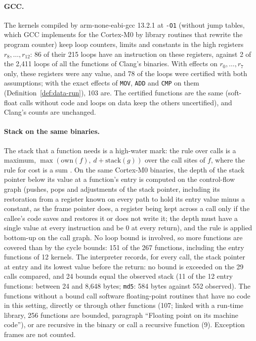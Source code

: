 \documentclass[oneside,english]{amsart}
\numberwithin{equation}{section}
\theoremstyle{plain}
\theoremstyle{definition}
\theoremstyle{plain}
\theoremstyle{plain}
\theoremstyle{remark}
\begin{document}
\paragraph{GCC.} The kernels compiled by arm-none-eabi-gcc 13.2.1 at \texttt{-O1} (without jump tables, which GCC implements for the Cortex-M0 by library routines that rewrite the program counter) keep loop counters, limits and constants in the high registers $r_8, \dots, r_{12}$: 86 of their 215 loops have an instruction on these registers, against 2 of the 2{,}411 loops of all the functions of Clang's binaries. With effects on $r_0, \dots, r_7$ only, these registers were any value, and 78 of the loops were certified with both assumptions; with the exact effects of \texttt{MOV}, \texttt{ADD} and \texttt{CMP} on them (Definition~\ref{def:data-run}), 103 are. The certified functions are the same (soft-float calls without code and loops on data keep the others uncertified), and Clang's counts are unchanged.

\paragraph{Stack on the same binaries.}
The stack that a function needs is a high-water mark: the rule over calls is a maximum, $\max(\mathrm{own}(f),\ d + \mathrm{stack}(g))$ over the call sites of $f$, where the rule for cost is a sum \cite[Proposition~\ref{I-prop:stack}]{crosscheckTheory}. On the same Cortex-M0 binaries, the depth of the stack pointer below its value at a function's entry is computed on the control-flow graph (pushes, pops and adjustments of the stack pointer, including its restoration from a register known on every path to hold its entry value minus a constant, as the frame pointer does, a register being kept across a call only if the callee's code saves and restores it or does not write it; the depth must have a single value at every instruction and be $0$ at every return), and the rule is applied bottom-up on the call graph. No loop bound is involved, so more functions are covered than by the cycle bounds: 151 of the 267 functions, including the entry functions of 12 kernels. The interpreter records, for every call, the stack pointer at entry and its lowest value before the return: no bound is exceeded on the 29 calls compared, and 24 bounds equal the observed stack (11 of the 12 entry functions: between 24 and 8{,}648 bytes; \texttt{md5}: 584 bytes against 552 observed). The functions without a bound call software floating-point routines that have no code in this setting, directly or through other functions (107; linked with a run-time library, 256 functions are bounded, paragraph ``Floating point on its machine code''), or are recursive in the binary or call a recursive function (9). Exception frames are not counted.
\end{document}
